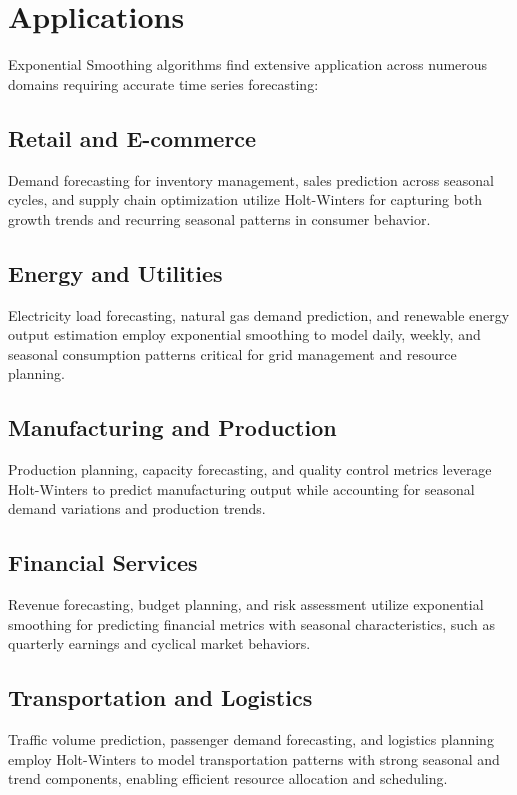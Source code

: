 \section{Applications}
\label{sec:applications}

Exponential Smoothing algorithms find extensive application across numerous domains requiring accurate time series forecasting:

\subsection{Retail and E-commerce}
Demand forecasting for inventory management, sales prediction across seasonal cycles, and supply chain optimization utilize Holt-Winters for capturing both growth trends and recurring seasonal patterns in consumer behavior.

\subsection{Energy and Utilities}
Electricity load forecasting, natural gas demand prediction, and renewable energy output estimation employ exponential smoothing to model daily, weekly, and seasonal consumption patterns critical for grid management and resource planning.

\subsection{Manufacturing and Production}
Production planning, capacity forecasting, and quality control metrics leverage Holt-Winters to predict manufacturing output while accounting for seasonal demand variations and production trends.

\subsection{Financial Services}
Revenue forecasting, budget planning, and risk assessment utilize exponential smoothing for predicting financial metrics with seasonal characteristics, such as quarterly earnings and cyclical market behaviors.

\subsection{Transportation and Logistics}
Traffic volume prediction, passenger demand forecasting, and logistics planning employ Holt-Winters to model transportation patterns with strong seasonal and trend components, enabling efficient resource allocation and scheduling.

